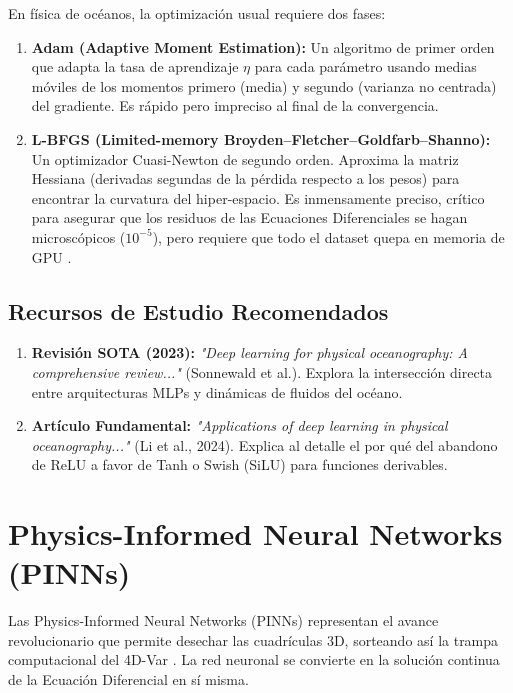 \documentclass[11pt,a4paper]{article}
\begin{document}
En física de océanos, la optimización usual requiere dos fases:
\begin{enumerate}
    \item \textbf{Adam (Adaptive Moment Estimation):} Un algoritmo de primer orden que adapta la tasa de aprendizaje $\eta$ para cada parámetro usando medias móviles de los momentos primero (media) y segundo (varianza no centrada) del gradiente. Es rápido pero impreciso al final de la convergencia.
    \item \textbf{L-BFGS (Limited-memory Broyden–Fletcher–Goldfarb–Shanno):} Un optimizador Cuasi-Newton de segundo orden. Aproxima la matriz Hessiana (derivadas segundas de la pérdida respecto a los pesos) para encontrar la curvatura del hiper-espacio. Es inmensamente preciso, crítico para asegurar que los residuos de las Ecuaciones Diferenciales se hagan microscópicos ($10^{-5}$), pero requiere que todo el dataset quepa en memoria de GPU \cite{raissi2019}.
\end{enumerate}

\subsection{Recursos de Estudio Recomendados}
\begin{enumerate}
    \item \textbf{Revisión SOTA (2023):} \textit{"Deep learning for physical oceanography: A comprehensive review..."} (Sonnewald et al.). Explora la intersección directa entre arquitecturas MLPs y dinámicas de fluidos del océano.
    \item \textbf{Artículo Fundamental:} \textit{"Applications of deep learning in physical oceanography..."} (Li et al., 2024). Explica al detalle el por qué del abandono de ReLU a favor de Tanh o Swish (SiLU) para funciones derivables.
\end{enumerate}

\newpage
\section{Physics-Informed Neural Networks (PINNs)}

Las Physics-Informed Neural Networks (PINNs) representan el avance revolucionario que permite desechar las cuadrículas 3D, sorteando así la trampa computacional del 4D-Var \cite{raissi2019}. La red neuronal se convierte en la solución continua de la Ecuación Diferencial en sí misma.
\end{document}

